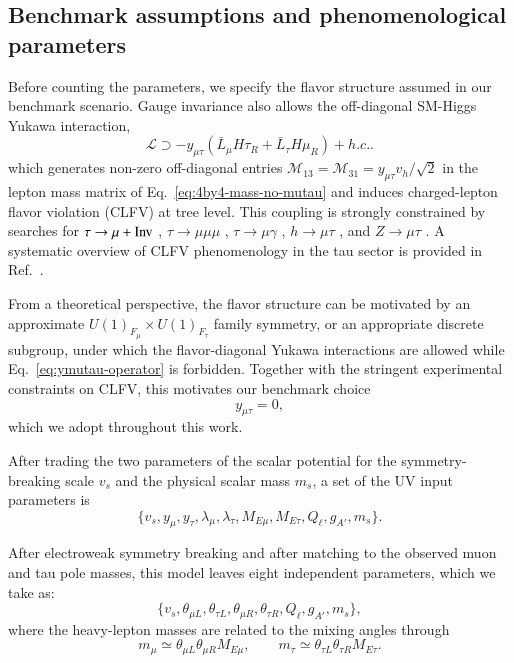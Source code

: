 \documentclass[onecolumn, aps, nofootinbib, prd, preprint, floats, floatfix, amsmath, amssymb, superscriptaddress, preprintnumbers]{revtex4-2}
\begin{document}
\subsection{Benchmark assumptions and phenomenological parameters}

Before counting the parameters, we specify the flavor structure assumed in our benchmark scenario. Gauge invariance also allows the off-diagonal SM-Higgs Yukawa interaction,
\begin{equation}
    \mathcal{L}\supset
    -y_{\mu\tau}(\bar{L}_{\mu}H \tau_R + \bar{L}_{\tau}H \mu_R)+h.c. .
\label{eq:ymutau-operator}
\end{equation}
which generates non-zero off-diagonal entries
$\mathcal{M}_{13}=\mathcal{M}_{31}=y_{\mu\tau}v_h/\sqrt{2}$
in the lepton mass matrix of Eq.~\eqref{eq:4by4-mass-no-mutau} and induces charged-lepton flavor violation (CLFV) at tree level. This coupling is strongly constrained by searches for
$\tau\to\mu+{\rm Inv}$ \cite{Ibarra:2021xyk},
$\tau\to\mu\mu\mu$ \cite{Ibarra:2021xyk,Hayasaka:2010np,Belle-II:2024sce},
$\tau\to\mu\gamma$ \cite{Belle:2021ysv},
$h\to\mu\tau$ \cite{Harnik:2012pb,CMS:2021rsq}, and
$Z\to\mu\tau$ \cite{ATLAS:2021bdj}.
A systematic overview of CLFV phenomenology in the tau sector is provided in Ref.~\cite{Banerjee:2022xuw}.

From a theoretical perspective, the flavor structure can be motivated by an approximate
$U(1)_{F_\mu}\times U(1)_{F_\tau}$ family symmetry, or an appropriate discrete subgroup, under which the flavor-diagonal Yukawa interactions are allowed while Eq.~\eqref{eq:ymutau-operator} is forbidden. Together with the stringent experimental constraints on CLFV, this motivates our benchmark choice
\begin{equation}
y_{\mu\tau}=0,
\end{equation}
which we adopt throughout this work.



After trading the two parameters of the scalar potential for the symmetry-breaking scale $v_s$ and the physical scalar mass $m_s$, a set of the UV input parameters is
\begin{equation}
    \{v_s, y_\mu, y_\tau, \lambda_\mu,\lambda_\tau, M_{E\mu}, M_{E\tau}, Q_\ell, g_{A'}, m_s \}.
\end{equation}

After electroweak symmetry breaking and after matching to the observed muon and tau pole masses, this model leaves eight independent parameters, which we take as:
\begin{equation}
    \{v_s, \theta_{\mu L}, \theta_{\tau L}, \theta_{\mu R},\theta_{\tau R}, Q_\ell, g_{A'}, m_s \},
    \end{equation}
where the heavy-lepton masses are related to the mixing angles through
\begin{equation}
    m_\mu\simeq \theta_{\mu L} \theta_{\mu R} M_{E\mu}, \qquad
    m_\tau\simeq \theta_{\tau L} \theta_{\tau R} M_{E\tau}.
    \end{equation}
\end{document}
